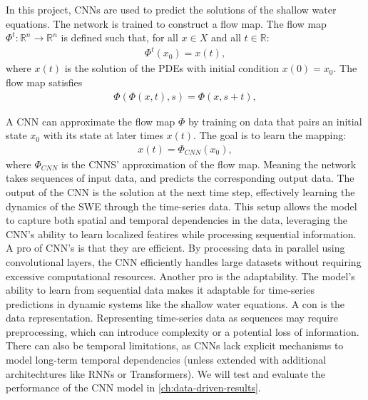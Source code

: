 In this project, CNNs are used to predict the solutions of the shallow water equations. 
The network is trained to construct a flow map. %
The flow map $\Phi^t: \mathbb{R}^n \rightarrow \mathbb{R}^n$ is defined such that, for all $x \in X$ and all $t \in \mathbb{R}$:
\begin{align*}
    \Phi^t(x_0) =  x(t),
\end{align*}
where $x(t)$ is the solution of the PDEs with initial condition $x(0) = x_0$.
The flow map satisfies
\begin{align*}
    \Phi(\Phi (x, t), s) = \Phi(x, s + t),
\end{align*}

A CNN can approximate the flow map $\Phi$ by training on data that pairs an initial state $x_0$ with its state at later times $x(t)$.
The goal is to learn the mapping:
\begin{align*}
    x(t) = \Phi_{CNN} (x_0), 
\end{align*}
where $\Phi_{CNN}$ is the CNNS' approximation of the flow map.
Meaning the network takes sequences of input data, and predicts the corresponding output data.
The output of the CNN is the solution at the next time step, effectively learning the dynamics of the SWE through the time-series data.
This setup allows the model to capture both spatial and temporal dependencies in the data, leveraging the CNN's ability to learn localized featires while processing sequential information.
A pro of CNN's is that they are efficient. By processing data in parallel using convolutional layers, the CNN efficiently handles large datasets without requiring excessive computational resources.
Another pro is the adaptability. 
The model's ability to learn from sequential data makes it adaptable for time-series predictions in dynamic systems like the shallow water equations.
A con is the data representation. Representing time-series data as sequences may require preprocessing, which can introduce complexity or a potential loss of information.
There can also be temporal limitations, as CNNs lack explicit mechanisms to model long-term temporal dependencies (unless extended with additional architechtures like RNNs or Transformers).
We will test and evaluate the performance of the CNN model in \autoref{ch:data-driven-results}.



